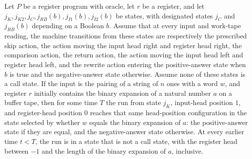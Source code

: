 \begin{lemma}
\label{Complexity.LogProg.jeqPlain_run}
\leanok
{}
Let $P$ be a register program with oracle, let $r$ be a register, and let
$j_K,j_{K2},j_C,j_{RB}(b),j_{I1}(b),j_{I2}(b)$ be states, with designated states $j_C$
and $j_{RB}(b)$ depending on a Boolean $b$. Assume that at every input and work-tape
reading, the machine transitions from these states are respectively the prescribed skip
action, the action moving the input head right and register head right, the comparison
action, the return action, the action moving the input head left and register head left,
and the rewrite action entering the positive-answer state when $b$ is true and the
negative-answer state otherwise. Assume none of these states is a call state. If the
input is the pairing of a string of $n$ ones with a word $w$, and register $r$ initially
contains the binary expansion of a natural number $a$ on a buffer tape, then for some
time $T$ the run from state $j_K$, input-head position $1$, and register-head position
$0$ reaches that same head-position configuration in the state selected by whether $w$
equals the binary expansion of $a$: the positive-answer state if they are equal, and the
negative-answer state otherwise. At every earlier time $t<T$, the run is in a state that
is not a call state, with the register head between $-1$ and the length of the binary
expansion of $a$, inclusive.
\end{lemma}
